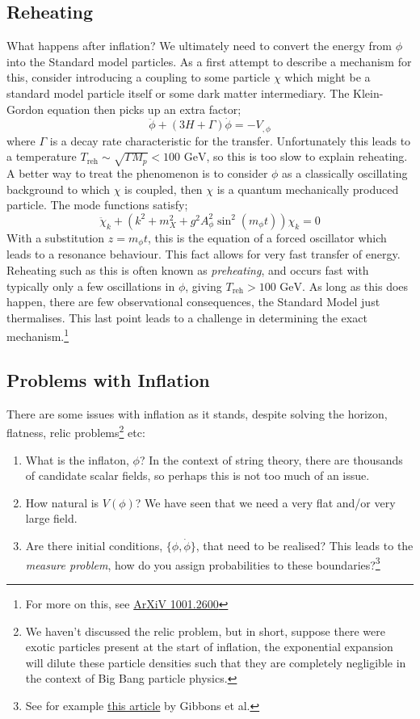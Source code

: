 \subsection{Reheating}
What happens after inflation? We ultimately need to convert the energy from $\phi$ into the Standard model particles. As a first attempt to describe a mechanism for this, consider introducing a coupling to some particle $\chi$ which might be a standard model particle itself or some dark matter intermediary. The Klein-Gordon equation then picks up an extra factor;
\begin{equation*}
\ddot{\phi} + (3H + \Gamma)\dot{\phi} = -V_{, \phi}
\end{equation*}
where $\Gamma$ is a decay rate characteristic for the transfer. Unfortunately this leads to a temperature $T_{\text{reh}} \sim \sqrt{\Gamma M_p} < 100 \,\,\text{GeV}$, so this is too slow to explain reheating. A better way to treat the phenomenon is to consider $\phi$ as a classically oscillating background to which $\chi$ is coupled, then $\chi$ is a quantum mechanically produced particle. The mode functions satisfy;
\begin{equation*}
\ddot{\chi}_k + \left(k^2 + m_X^2 + g^2 A_\phi^2 \sin^2 (m_\phi t)\right)\chi_k = 0
\end{equation*} 
With a substitution $z = m_\phi t$, this is the equation of a forced oscillator which leads to a resonance behaviour. This fact allows for very fast transfer of energy. Reheating such as this is often known as \emph{preheating}, and occurs fast with typically only a few oscillations in $\phi$, giving $T_{\text{reh}} > 100\,\,\text{GeV}$. As long as this does happen, there are few observational consequences, the Standard Model just thermalises. This last point leads to a challenge in determining the exact mechanism.\footnote{For more on this, see \href{https://arxiv.org/pdf/1001.2600.pdf}{ArXiV 1001.2600}}
\subsection{Problems with Inflation}
There are some issues with inflation as it stands, despite solving the horizon, flatness, relic problems\footnote{We haven't discussed the relic problem, but in short, suppose there were exotic particles present at the start of inflation, the exponential expansion will dilute these particle densities such that they are completely negligible in the context of Big Bang particle physics.} etc:
\begin{enumerate}
\item What is the inflaton, $\phi$? In the context of string theory, there are thousands of candidate scalar fields, so perhaps this is not too much of an issue.
\item How natural is $V(\phi)$? We have seen that we need a very flat and/or very large field.
\item Are there initial conditions, $\{\phi, \dot{\phi}\}$, that need to be realised? This leads to the \emph{measure problem}, how do you assign probabilities to these boundaries?\footnote{See for example \href{https://arxiv.org/pdf/hep-th/0609095.pdf}{this article} by Gibbons et al.}
\end{enumerate}
